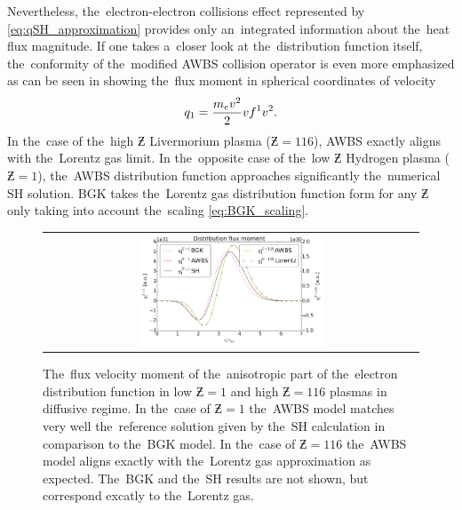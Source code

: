 Nevertheless, the~electron-electron collisions effect represented by 
\eqref{eq:qSH_approximation} provides only an~integrated information about
the~heat flux magnitude. If one takes a~closer look at the~distribution
function itself, the~conformity of the~modified AWBS collision operator
is even more emphasized as can be seen in  showing
the~flux moment in spherical coordinates of velocity
\begin{equation}
  q_1 = \frac{m_ev^2}{2}v f^1 v^2 .
  \label{eq:q1}
\end{equation}
In the~case of the~high $\Zbar$ Livermorium plasma ($\Zbar = 116$), 
AWBS exactly aligns with the~Lorentz gas limit. In the~opposite case of the~low
$\Zbar$ Hydrogen plasma ($\Zbar = 1$), the~AWBS distribution function 
approaches significantly the~numerical SH solution. BGK takes 
the~Lorentz gas distribution function form for any $\Zbar$ only taking into 
account the~scaling \eqref{eq:BGK_scaling}.  

\begin{figure}[tbh]
  \begin{center}
    \begin{tabular}{c}
      \includegraphics[width=0.5\textwidth]{q1s.png}
    \end{tabular}
  \caption{  
  The~flux velocity moment of the~anisotropic part of the~electron distribution 
  function in low $\Zbar=1$ and high $\Zbar=116$ plasmas in diffusive regime. 
  In the~case of $\Zbar = 1$ the~AWBS model matches very well 
  the~reference solution given by the~SH calculation \cite{SpitzerHarm_PR1953} 
  in comparison to the~BGK model. In the~case of $\Zbar = 116$ the~AWBS model
  aligns exactly with the~Lorentz gas approximation as expected. The~BGK and 
  the~SH results are not shown, but correspond excatly to the~Lorentz gas.}
  \label{fig:q1s_summary}
  \end{center} 
\end{figure}

